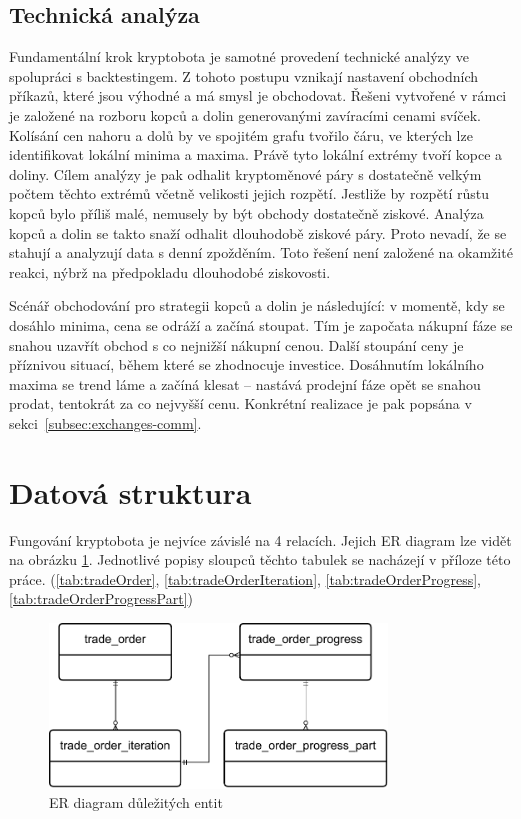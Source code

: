 \subsection{Technická analýza}
Fundamentální krok kryptobota je samotné provedení technické analýzy ve spolupráci s backtestingem. Z tohoto postupu vznikají nastavení obchodních příkazů, které jsou výhodné
a má smysl je obchodovat. Řešeni vytvořené v rámci je založené na rozboru kopců a dolin generovanými zavíracími cenami svíček. Kolísání cen nahoru a dolů by ve spojitém grafu
tvořilo čáru, ve kterých lze identifikovat lokální minima a maxima. Právě tyto lokální extrémy tvoří kopce a doliny. Cílem analýzy je pak odhalit kryptoměnové páry s dostatečně
velkým počtem těchto extrémů včetně velikosti jejich rozpětí. Jestliže by rozpětí růstu kopců bylo příliš malé, nemusely by být obchody dostatečně ziskové. Analýza kopců a dolin se takto
snaží odhalit dlouhodobě
ziskové páry. Proto nevadí, že se stahují a analyzují data s denní zpožděním. Toto řešení není založené na okamžité reakci, nýbrž na předpokladu dlouhodobé ziskovosti.

Scénář obchodování pro strategii kopců a dolin je následující: v momentě, kdy se dosáhlo minima, cena se odráží a začíná stoupat. Tím je započata nákupní fáze
se snahou uzavřít obchod s co nejnižší nákupní cenou. Další stoupání ceny je příznivou situací, během které se zhodnocuje investice. Dosáhnutím lokálního maxima se trend láme a začíná klesat
-- nastává prodejní fáze opět se snahou prodat, tentokrát za co nejvyšší cenu. Konkrétní realizace je pak popsána v sekci~\ref{subsec:exchanges-comm}.


\section{Datová struktura}
Fungování kryptobota je nejvíce závislé na 4 relacích. Jejich ER diagram lze vidět na obrázku \ref{fig:er-diag}. Jednotlivé popisy sloupců těchto tabulek se nacházejí v příloze této
práce. (\ref{tab:tradeOrder}, \ref{tab:tradeOrderIteration}, \ref{tab:tradeOrderProgress}, \ref{tab:tradeOrderProgressPart})

\begin{figure}[h]
    \centering
    \includegraphics[width=0.8\textwidth]{Figures/er-trade-order.pdf}
    \caption{ER diagram důležitých entit}
    \label{fig:er-diag}
\end{figure}

